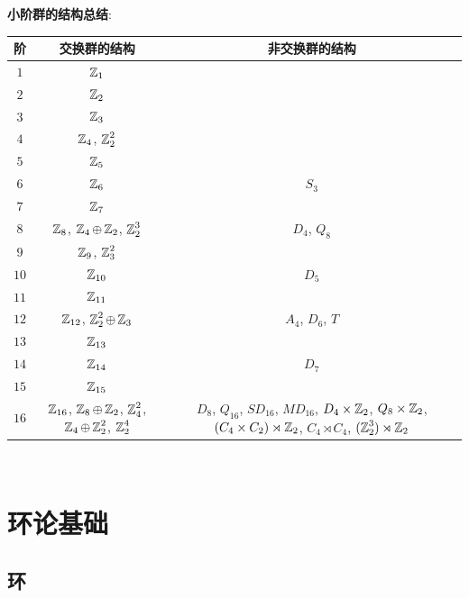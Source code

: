             \begin{rmk}
                \textbf{小阶群的结构总结}:\\
                \begin{tabular}{c|cc}
                    阶 & 交换群的结构 & 非交换群的结构\\
                    \hline
                    \(1\) & \(\Z_1\) & \\
                    \(2\) & \(\Z_2\) & \\
                    \(3\) & \(\Z_3\) & \\
                    \(4\) & \(\Z_4\), \(\Z_2^2\) & \\
                    \(5\) & \(\Z_5\) & \\
                    \(6\) & \(\Z_6\) & \(S_3\)\\
                    \(7\) & \(\Z_7\) & \\
                    \(8\) & \(\Z_8\), \(\Z_4\oplus\Z_2\), \(\Z_2^3\) & \(D_4\), \(Q_8\)\\
                    \(9\) & \(\Z_9\), \(\Z_3^2\) & \\
                    \(10\) & \(\Z_{10}\) & \(D_5\)\\
                    \(11\) & \(\Z_{11}\) & \\
                    \(12\) & \(\Z_{12}\), \(\Z_2^2\oplus\Z_3\) & \(A_4\), \(D_6\), \(T\)\\
                    \(13\) & \(\Z_{13}\) & \\
                    \(14\) & \(\Z_{14}\) & \(D_7\)\\
                    \(15\) & \(\Z_{15}\) & \\
                    \(16\) & \(\Z_{16}\), \(\Z_8\oplus\Z_2\), \(\Z_4^2\), \(\Z_4\oplus\Z_2^2\), \(\Z_2^4\) & \(D_8\), \(Q_{16}\), \(SD_{16}\), \(MD_{16}\), \(D_4\times\Z_2\), \(Q_8\times\Z_2\), \((C_4 \times C_2) \rtimes \Z_2\), \(C_4 \rtimes C_4\), \((\Z_2^3) \rtimes \Z_2\)
                \end{tabular}\\
            \end{rmk}

\section{环论基础}

    \subsection{环}

